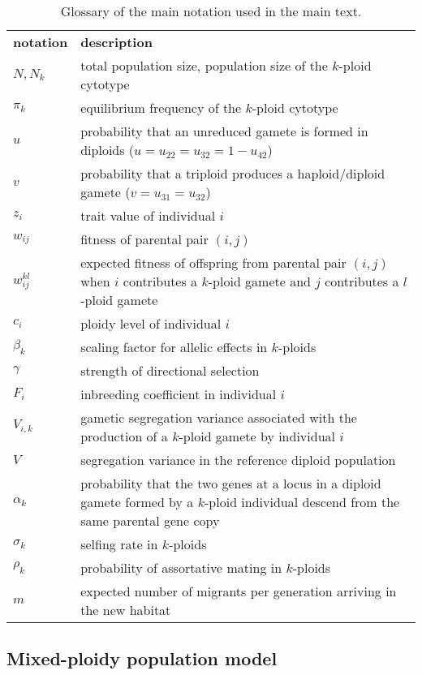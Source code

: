 \documentclass[11pt,a4paper]{article}
\begin{document}
\begin{table}[t]
\caption{Glossary of the main notation used in the main text.
} \label{tbl:glossary}
\centering
\small
\begin{tabularx}{\linewidth}{lX}
\cline{1-2}
\textbf{notation}   & \textbf{description}   \\ \cline{1-2}
$N, N_k$ & total population size, population size of the $k$-ploid cytotype \\
$\pi_k$ & equilibrium frequency of the $k$-ploid cytotype \\
$u$ & probability that an unreduced gamete is formed in diploids
($u=u_{22}=u_{32}=1-u_{42}$)\\
$v$ & probability that a triploid produces a haploid/diploid gamete
($v=u_{31}=u_{32}$)\\
$z_i$ & trait value of individual $i$ \\
$w_{ij}$ & fitness of parental pair $(i,j)$ \\
$w_{ij}^{kl}$ & expected fitness of offspring from parental pair $(i,j)$ when
$i$ contributes a $k$-ploid gamete and $j$ contributes a $l$-ploid gamete \\
$c_i$ & ploidy level of individual $i$ \\
$\beta_{k}$ & scaling factor for allelic effects in $k$-ploids \\
$\gamma$ & strength of directional selection \\
$F_i$ & inbreeding coefficient in individual $i$ \\
$V_{i,k}$ & gametic segregation variance associated with the production of a
  $k$-ploid gamete by individual $i$ \\
$V$ & segregation variance in the reference diploid population \\
  $\alpha_k$ & probability that the two genes at a locus in a diploid gamete
  formed by a $k$-ploid individual descend from the same parental gene copy\\
$\sigma_k$ & selfing rate in $k$-ploids \\
$\rho_k$ & probability of assortative mating in $k$-ploids \\
$m$ & expected number of migrants per generation arriving in the new habitat \\
\cline{1-2}
\end{tabularx}%
\end{table}

\subsection*{Mixed-ploidy population model}
\end{document}
